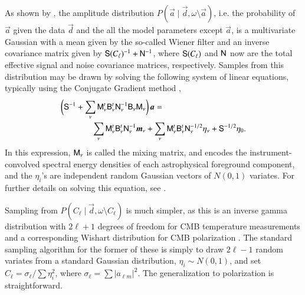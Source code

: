 \documentclass[twocolumn]{aa}
\renewcommand{\d}[0]{\vec{d}}
\renewcommand{\a}[0]{\vec{a}}
\newcommand{\m}[0]{\vec{m}}
\newcommand{\B}[0]{\tens{B}}
\newcommand{\N}[0]{\tens{N}}
\newcommand{\M}[0]{\tens{M}}
\renewcommand{\S}[0]{\tens{S}}
\begin{document}
As shown by \citet{jewell2004,wandelt2004}, the amplitude distribution
$P(\a\mid\d,\omega\setminus\a)$, i.e. the probability of $\a$ given the data $\d$ 
and the all the model parameters except $\a$, is a multivariate Gaussian with a
mean given by the so-called Wiener filter and an inverse covariance
matrix given by $\S(C_{\ell})^{-1}+\N^{-1}$, where $\S(C_{\ell})$ and $\N$ now are the
total effective signal and noise covariance matrices, respectively. Samples from this distribution may be
drawn by solving the following system of linear equations, typically
using the Conjugate Gradient method \citep{shewchuk:1994},
\begin{equation}
  \label{eq:wiener}
  \begin{split}
    \biggl(\S^{-1} + \sum_{\nu}\M^t_{\nu}\B^t_{\nu}&\N_{\nu}^{-1}\B_{\nu}\M_{\nu}\biggr)\,\a = \\
    \sum_\nu\M_\nu^t&\B_{\nu}^t\N_\nu^{-1}\m_{\nu} 
    + \sum_{\nu}\M_{\nu}^t\B_{\nu}^t\N_{\nu}^{-1/2}\eta_{\nu} +
    \S^{-1/2}\eta_{0}.
  \end{split}
\end{equation}
In this expression, $\M_{\nu}$ is called the mixing matrix, and
encodes the instrument-convolved spectral energy densities of each
astrophysical foreground component, and the $\eta_i$'s are independent
random Gaussian vectors of $N(0,1)$ variates. For further details on
solving this equation, see \citet{eriksen2008,seljebotn:2019,bp01,bp11}.

Sampling from $P(C_{\ell}\mid\d,\omega\setminus C_{\ell})$ is much
simpler, as this is an inverse gamma distribution with $2\ell+1$
degrees of freedom for CMB temperature measurements
\citep{wandelt2004} and a corresponding Wishart distribution for CMB
polarization \citep{larson:2006}. The standard sampling algorithm for
the former of these is simply to draw $2\ell-1$ random variates from a
standard Gaussian distribution, $\eta_i\sim N(0,1)$, and set $C_{\ell}
= \sigma_{\ell} / \sum \eta_i^2$, where $\sigma_\ell = \sum |a_{\ell
  m}|^2$. The generalization to polarization is straightforward.
\end{document}
